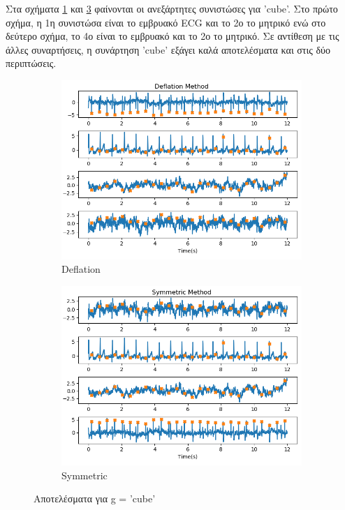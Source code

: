 \noindent Στα σχήματα \en \ref{fig:5.23a} \gr και \en \ref{fig:5.23b} \gr φαίνονται οι ανεξάρτητες συνιστώσες για \en 'cube'. \gr Στο πρώτο σχήμα, η 1η συνιστώσα είναι το εμβρυακό \en ECG \gr και το 2ο το μητρικό ενώ στο δεύτερο σχήμα, το 4ο είναι το εμβρυακό και το 2ο το μητρικό. Σε αντίθεση με τις άλλες συναρτήσεις, η συνάρτηση \en 'cube' \gr εξάγει καλά αποτελέσματα και στις δύο περιπτώσεις.
\begin{figure}[H]
    \centering
    \begin{subfigure}{0.48 \textwidth}
        \centering
       \includegraphics[width=\textwidth]{r01database/cube_def.png} \en
        \caption{Deflation} \gr
        \label{fig:5.23a}
    \end{subfigure}
    \hfill
    \begin{subfigure}{0.48 \textwidth}
        \centering
       \includegraphics[width=\textwidth]{r01database/cube_sym.png} \en
        \en
        \caption{Symmetric} \gr
        \label{fig:5.23b}
    \end{subfigure}
    \gr
    \caption{Αποτελέσματα για \en g = 'cube' \gr}
\end{figure}

